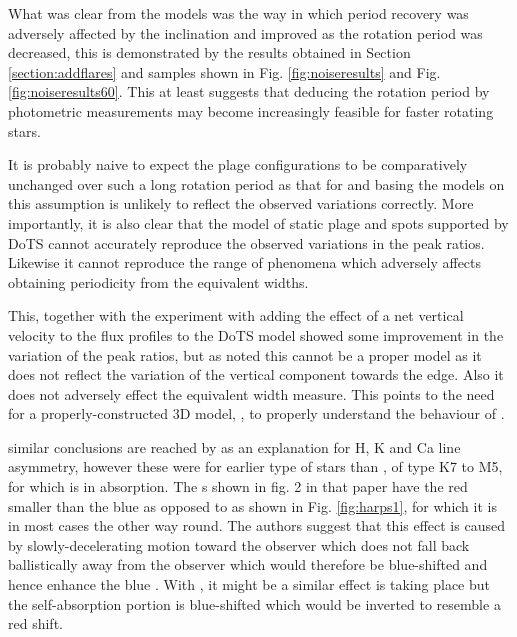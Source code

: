 What was clear from the models was the way in which period recovery was adversely affected by the inclination and
improved as the rotation period was decreased, this is demonstrated by the results obtained in Section
\ref{section:addflares} and samples shown in Fig. \ref{fig:noiseresults} and Fig. \ref{fig:noiseresults60}. This at
least suggests that deducing the rotation period by photometric measurements may become increasingly feasible for faster
rotating stars. 

It is probably naive to expect the plage configurations to be comparatively unchanged over such a long rotation period
as that for {\prox} and basing the models on this assumption is unlikely to reflect the observed variations
correctly. More importantly, it is also clear that the model of static plage and spots supported by DoTS cannot
accurately reproduce the observed variations in the peak ratios. Likewise it cannot reproduce the range of phenomena which
adversely affects obtaining periodicity from the equivalent widths.

This, together with the experiment with adding the effect of a net vertical velocity to the flux profiles to the DoTS
model showed some improvement in the variation of the peak ratios, but as noted this cannot be a proper model as it does
not reflect the variation of the vertical component towards the edge. Also it does not adversely effect the equivalent
width measure. This points to the need for a properly-constructed 3D model, , to properly understand the behaviour of \prox.

 similar conclusions are reached by \citet{rauscher06} as an explanation for H, K and Ca
  line asymmetry, however these were for earlier type of stars than \prox, of type K7 to M5, for which {\ha} is in
  absorption. The \horn s shown in fig. 2 in that paper have the red {\horn} smaller than the blue {\horn} as opposed to
  {\prox} as shown in Fig. \ref{fig:harps1}, for which it is in most cases the other way round. The authors suggest that
  this effect is caused by slowly-decelerating motion toward the observer which does not fall back ballistically away
  from the observer which would therefore be blue-shifted and hence enhance the blue \horn. With \prox, it might be a
  similar effect is taking place but the self-absorption portion is blue-shifted which would be inverted to resemble a
  red shift.
